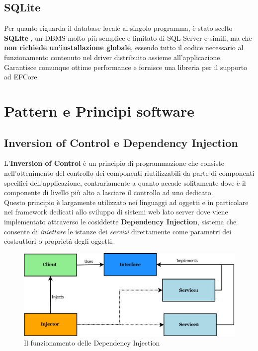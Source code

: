 \documentclass[\main/Tesi.tex]{subfiles}
\begin{document}
\subsection{SQLite}
Per quanto riguarda il database locale al singolo programma, è stato scelto \textbf{SQLite} \cite{sqlite}, un DBMS molto più semplice e limitato di SQL Server e simili, ma che \textbf{non richiede un'installazione globale}, essendo tutto il codice necessario al funzionamento contenuto nel driver distribuito assieme all'applicazione.\\
Garantisce comunque ottime performance e fornisce una libreria per il supporto ad EFCore.

\section{Pattern e Principi software}

\subsection{Inversion of Control e Dependency Injection}
\label{ioc}
L'\textbf{Inversion of Control} \cite{ioc} è un principio di programmazione che consiste nell'ottenimento del controllo dei componenti riutilizzabili da parte di componenti specifici dell'applicazione, contrariamente a quanto accade solitamente dove è il componente di livello più alto a lasciare il controllo ad uno dedicato.\\
Questo principio è largamente utilizzato nei linguaggi ad oggetti e in particolare nei framework dedicati allo sviluppo di sistemi web lato server dove viene implementato attraverso le cosiddette \textbf{Dependency Injection}, sistema che consente di \textit{iniettare} le istanze dei \textit{servizi} direttamente come parametri dei costruttori o proprietà degli oggetti.\\

\begin{figure}[h]
\caption{Il funzionamento delle Dependency Injection}
\includegraphics[width=\textwidth]{../images/ioc.png}
\end{figure}
\end{document}
